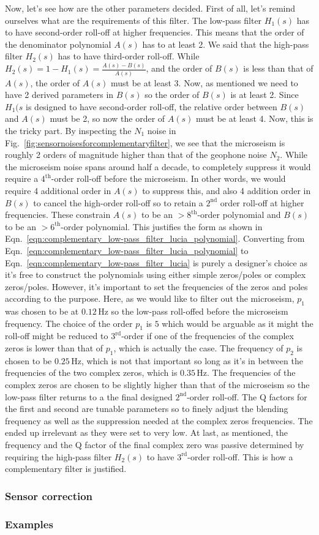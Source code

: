 Now, let's see how are the other parameters decided.
First of all, let's remind ourselves what are the requirements of this filter.
The low-pass filter $H_1(s)$ has to have second-order roll-off at higher frequencies.
This means that the order of the denominator polynomial $A(s)$ has to at least 2.
We said that the high-pass filter $H_2(s)$ has to have third-order roll-off.
While $H_2(s) = 1-H_1(s) = \frac{A(s)-B(s)}{A(s)}$, and the order of $B(s)$ is less than that of $A(s)$, the order of $A(s)$ must be at least 3.
Now, as mentioned we need to have 2 derived parameters in $B(s)$ so the order of $B(s)$ is at least 2.
Since $H_1(s$ is designed to have second-order roll-off, the relative order between $B(s)$ and $A(s)$ must be 2, so now the order of $A(s)$ must be at least 4.
Now, this is the tricky part.
By inspecting the $N_1$ noise in Fig.~\ref{fig:sensornoisesforcomplementaryfilter}, we see that the microseism is roughly 2 orders of magnitude higher than that of the geophone noise $N_2$.
While the microseism noise spans around half a decade, to completely suppress it would require a $4^\mathrm{th}$-order roll-off before the microseism.
In other words, we would require 4 additional order in $A(s)$ to suppress this, and also 4 addition order in $B(s)$ to cancel the high-order roll-off so to retain a $2^\mathrm{nd}$ order roll-off at higher frequencies.
These constrain $A(s)$ to be an $>8^\mathrm{th}$-order polynomial and $B(s)$ to be an $>6^\mathrm{th}$-order polynomial.
This justifies the form as shown in Eqn.~\eqref{eqn:complementary_low-pass_filter_lucia_polynomial}.
Converting from Eqn.~\eqref{eqn:complementary_low-pass_filter_lucia_polynomial} to Eqn.~\eqref{eqn:complementary_low-pass_filter_lucia} is purely a designer's choice as it's free to construct the polynomials using either simple zeros/poles or complex zeros/poles.
However, it's important to set the frequencies of the zeros and poles according to the purpose.
Here, as we would like to filter out the microseism, $p_1$ was chosen to be at $0.12\,\mathrm{Hz}$ so the low-pass roll-offed before the microseism frequency.
The choice of the order $p_1$ is $5$ which would be arguable as it might the roll-off might be reduced to $3^\mathrm{rd}$-order if one of the frequencies of the complex zeros is lower than that of $p_1$, which is actually the case.
The frequency of $p_2$ is chosen to be $0.25\,\mathrm{Hz}$, which is not that important so long as it's
in between the frequencies of the two complex zeros, which is $0.35\,\mathrm{Hz}$.
The frequencies of the complex zeros are chosen to be slightly higher than that of the microseism so the low-pass filter returns to a the final designed $2^\mathrm{nd}$-order roll-off.
The Q factors for the first and second are tunable parameters so to finely adjust the blending frequency as well as the suppression needed at the complex zeros frequencies.
The ended up irrelevant as they were set to very low.
At last, as mentioned, the frequency and the Q factor of the final complex zero was passive determined by requiring the high-pass filter $H_2(s)$ to have $3^\mathrm{rd}$-order roll-off.
This is how a complementary filter is justified.

\subsubsection{Sensor correction \label{sec:sensor_correction}}
\subsubsection{Examples \label{sec:sensor_fusion_examples}}